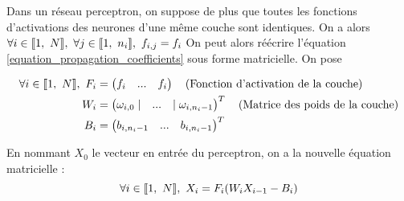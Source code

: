 Dans un réseau perceptron, on suppose de plus que toutes les fonctions d'activations des neurones d'une même couche sont identiques. On a alors $\forall i \in \brackets{1,\ N},\ \forall j \in \brackets{1,\ n_i},\ f_{i,j} = f_i$
On peut alors réécrire l'équation \eqref{equation_propagation_coefficients} sous forme matricielle. On pose

\begin{align*}
\forall i \in \llbracket 1,\ N \rrbracket,\ F_i &= \begin{pmatrix} f_i & ... & f_i \end{pmatrix}\quad \text{(Fonction d'activation de la couche)}\\
                            W_i &= \begin{pmatrix} \omega_{i,0} \mid & ... & \mid \omega_{i, n_i-1}\end{pmatrix}^T \quad \text{(Matrice des poids de la couche)} \\
                            B_i &= \begin{pmatrix} b_{i, n_i-1} & ... & b_{i, n_i-1}\end{pmatrix}^T 
\end{align*}

En nommant $X_0$ le vecteur en entrée du perceptron, on a la nouvelle équation matricielle : 
\begin{equation}
  \forall i \in \brackets{1,\ N},\ X_i = F_i(W_i X_{i-1} - B_i) 
  \label{equation_propagation_matricielle}
\end{equation}
